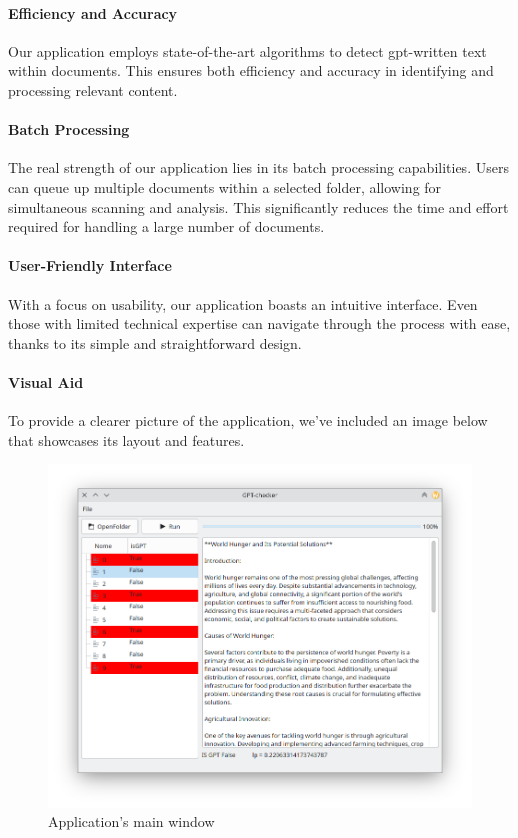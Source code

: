 \paragraph{Efficiency and Accuracy} Our application employs state-of-the-art algorithms to detect gpt-written 
text within documents. This ensures both efficiency and accuracy in identifying and processing relevant content.

\paragraph{Batch Processing} The real strength of our application lies in its batch processing capabilities. 
Users can queue up multiple documents within a selected folder, allowing for simultaneous scanning and analysis. 
This significantly reduces the time and effort required for handling a large number of documents.

\paragraph{User-Friendly Interface} With a focus on usability, our application boasts an intuitive interface. 
Even those with limited technical expertise can navigate through the process with ease, thanks to its simple and 
straightforward design.

\paragraph{Visual Aid} To provide a clearer picture of the application, we've included an image below that showcases 
its layout and features.

\begin{figure}
	\centering
	\includegraphics[width=0.9\linewidth]{images/Application/screen}
	\caption{Application's main window}
	\label{fig:screen}
\end{figure}

